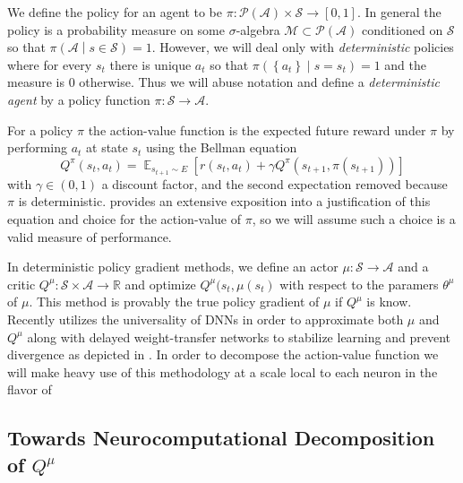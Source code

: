 \documentclass{article} %
\numberwithin{equation}{subsection}
\numberwithin{theorem}{subsection}
\def\expect{\mathop{{\mathbb{E}}}}
\newcommand{\set}[1]{ \left\{ #1 \right\} }
\def\suchthat{\mathrel{}\middle|\mathrel{}}
\def\scriptm{{\mathcal M}}
\def\scripta{{\mathcal A}}
\def\scriptp{{\mathcal P}}
\def\scripts{{\mathcal S}}
\begin{document}
We define the policy for an agent to be $\pi: \scriptp(\scripta) \times \scripts \to [0,1]$. In general the policy is a probability measure on some $\sigma$-algebra $\scriptm \subset \scriptp(\scripta)$ conditioned on $\scripts$ so that $\pi\left(\scripta \suchthat s \in \scripts\right) = 1$. However, we will deal only with \emph{deterministic} policies where for every $s_t$ there is unique $a_t$ so that $\pi\left(\set{a_t} \suchthat s = s_t\right) = 1$ and the measure is $0$ otherwise. Thus we will abuse notation and define a \emph{deterministic agent} by a policy function $\pi: \scripts \to \scripta$.	

For a policy $\pi$  the action-value function is the expected future reward under $\pi$ by performing $a_t$ at state $s_t$ using the Bellman equation
\begin{equation}
	Q^{\pi}(s_t, a_t) = \expect_{s_{t+1} \sim E}\left[r(s_{t}, a_t) + \gamma Q^{\pi}(s_{t+1}, \pi(s_{t+1}))\right]
\end{equation}
with $\gamma \in (0,1)$ a discount factor, and the second expectation removed because $\pi$ is deterministic.  provides an extensive exposition into a justification of this equation and choice for the action-value of $\pi$, so we will assume such a choice is a valid measure of performance.

In deterministic policy gradient methods, we define an actor $\mu: \scripts \to \scripta$ and a critic $Q^\mu: \scripts \times \scripta \to \mathbb{R}$ and optimize $Q^\mu(s_t, \mu(s_t)$ with respect to the paramers $\theta^\mu$ of $\mu.$ This method is provably the true policy gradient of $\mu$ if $Q^\mu$ is know. Recently  utilizes the universality of DNNs in order to approximate both $\mu$ and $Q^\mu$ along with delayed weight-transfer networks to stabilize learning and  prevent divergence as depicted in . In order to decompose the action-value function we will make heavy use of this methodology at a scale local to each neuron in the flavor of 

\subsection{Towards Neurocomputational Decomposition of $Q^\mu$}

 
\end{document}
